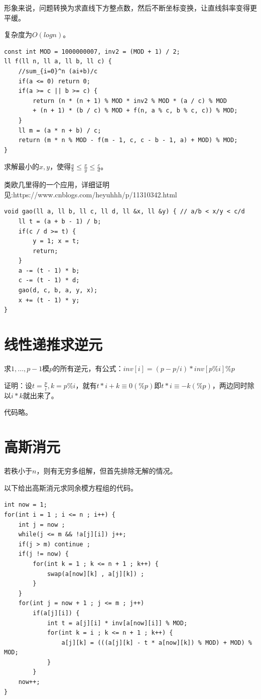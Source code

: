 \documentclass[a4paper,11pt,twoside,fontset = fandol,UTF8]{ctexbook} %
\begin{document}
	形象来说，问题转换为求直线下方整点数，然后不断坐标变换，让直线斜率变得更平缓。
	
	复杂度为$O(logn)$。
	\begin{lstlisting}
const int MOD = 1000000007, inv2 = (MOD + 1) / 2;
ll f(ll n, ll a, ll b, ll c) {
	//sum_{i=0}^n (ai+b)/c
    if(a <= 0) return 0;
    if(a >= c || b >= c) {
        return (n * (n + 1) % MOD * inv2 % MOD * (a / c) % MOD
        + (n + 1) * (b / c) % MOD + f(n, a % c, b % c, c)) % MOD;
    }
    ll m = (a * n + b) / c;
    return (m * n % MOD - f(m - 1, c, c - b - 1, a) + MOD) % MOD;
} 
	\end{lstlisting}
	
	求解最小的$x,y$，使得$\frac{a}{b}\leq \frac{x}{y}\leq \frac{c}{d}$。
	
	类欧几里得的一个应用，详细证明见:https://www.cnblogs.com/heyuhhh/p/11310342.html
	
	\begin{lstlisting}
void gao(ll a, ll b, ll c, ll d, ll &x, ll &y) { // a/b < x/y < c/d
    ll t = (a + b - 1) / b;
    if(c / d >= t) {
        y = 1; x = t;
        return;
    }
    a -= (t - 1) * b;
    c -= (t - 1) * d;
    gao(d, c, b, a, y, x);
    x += (t - 1) * y;
}
	\end{lstlisting}
	\section{线性递推求逆元}
	求$1,\dots,p-1$模$p$的所有逆元，有公式：$inv[i]=(p-p/i)*inv[p\%i]\%p$
	
	证明：设$t=\frac{p}{i},k=p\%i$，就有$t*i+k\equiv 0(\% p)$即$t*i\equiv -k(\% p)$，两边同时除以$i*k$就出来了。
	
	代码略。
	\section{高斯消元}
	若秩小于$n$，则有无穷多组解，但首先排除无解的情况。
	
	以下给出高斯消元求同余模方程组的代码。
	\begin{lstlisting}
int now = 1;
for(int i = 1 ; i <= n ; i++) {
    int j = now ;
    while(j <= m && !a[j][i]) j++;
    if(j > m) continue ;
    if(j != now) {	
        for(int k = 1 ; k <= n + 1 ; k++) {
            swap(a[now][k] , a[j][k]) ;
        }
    }
    for(int j = now + 1 ; j <= m ; j++)
        if(a[j][i]) {
            int t = a[j][i] * inv[a[now][i]] % MOD;
            for(int k = i ; k <= n + 1 ; k++) {
                a[j][k] = (((a[j][k] - t * a[now][k]) % MOD) + MOD) % MOD;
            }
        }
    now++;
} 
	\end{lstlisting}
	
\end{document}
